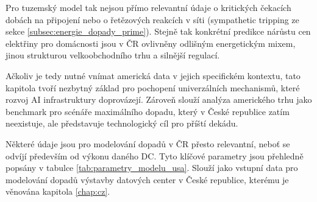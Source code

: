 Pro tuzemský model tak nejsou přímo relevantní údaje o kritických čekacích dobách na připojení nebo o řetězových reakcích v síti (sympathetic tripping ze sekce \ref{subsec:energie_dopady_prime}). Stejně tak konkrétní predikce nárůstu cen elektřiny pro domácnosti jsou v ČR ovlivněny odlišným energetickým mixem, jinou strukturou velkoobchodního trhu a silnější regulací.

Ačkoliv je tedy nutné vnímat americká data v jejich specifickém kontextu, tato kapitola tvoří nezbytný základ pro pochopení univerzálních mechanismů, které rozvoj AI infrastruktury doprovázejí. Zároveň slouží analýza amerického trhu jako benchmark pro scénáře maximálního dopadu, který v České republice zatím neexistuje, ale představuje technologický cíl pro příští dekádu.

Některé údaje jsou pro modelování dopadů v ČR přesto relevantní, neboť se odvíjí především od výkonu daného DC. Tyto klíčové parametry jsou přehledně popsány v tabulce \ref{tab:parametry_modelu_usa}. Slouží jako vstupní data pro modelování dopadů výstavby datových center v České republice, kterému je věnována kapitola \ref{chap:cz}.

